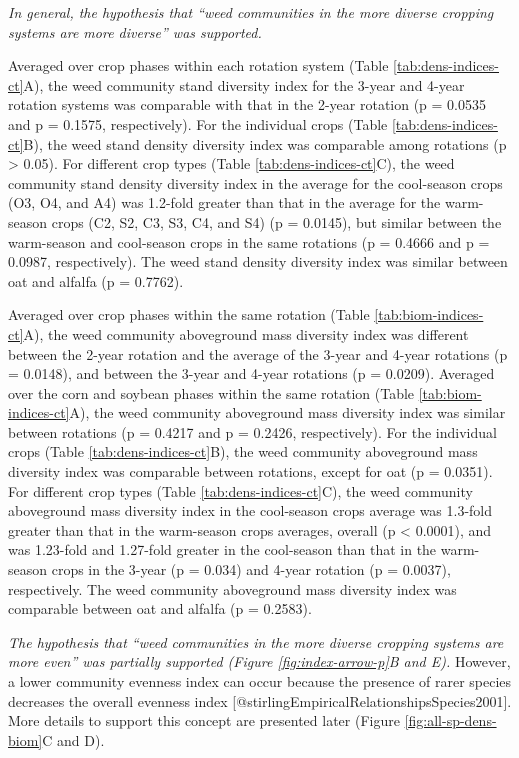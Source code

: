 \documentclass[
]{article}
\begin{document}
\emph{In general, the hypothesis that ``weed communities in the more diverse cropping systems are more diverse'' was supported.}

Averaged over crop phases within each rotation system (Table \ref{tab:dens-indices-ct}A), the weed community stand diversity index for the 3-year and 4-year rotation systems was comparable with that in the 2-year rotation (p = 0.0535 and p = 0.1575, respectively). For the individual crops (Table \ref{tab:dens-indices-ct}B), the weed stand density diversity index was comparable among rotations (p \textgreater{} 0.05). For different crop types (Table \ref{tab:dens-indices-ct}C), the weed community stand density diversity index in the average for the cool-season crops (O3, O4, and A4) was 1.2-fold greater than that in the average for the warm-season crops (C2, S2, C3, S3, C4, and S4) (p = 0.0145), but similar between the warm-season and cool-season crops in the same rotations (p = 0.4666 and p = 0.0987, respectively). The weed stand density diversity index was similar between oat and alfalfa (p = 0.7762).

Averaged over crop phases within the same rotation (Table \ref{tab:biom-indices-ct}A), the weed community aboveground mass diversity index was different between the 2-year rotation and the average of the 3-year and 4-year rotations (p = 0.0148), and between the 3-year and 4-year rotations (p = 0.0209). Averaged over the corn and soybean phases within the same rotation (Table \ref{tab:biom-indices-ct}A), the weed community aboveground mass diversity index was similar between rotations (p = 0.4217 and p = 0.2426, respectively). For the individual crops (Table \ref{tab:dens-indices-ct}B), the weed community aboveground mass diversity index was comparable between rotations, except for oat (p = 0.0351). For different crop types (Table \ref{tab:dens-indices-ct}C), the weed community aboveground mass diversity index in the cool-season crops average was 1.3-fold greater than that in the warm-season crops averages, overall (p \textless{} 0.0001), and was 1.23-fold and 1.27-fold greater in the cool-season than that in the warm-season crops in the 3-year (p = 0.034) and 4-year rotation (p = 0.0037), respectively. The weed community aboveground mass diversity index was comparable between oat and alfalfa (p = 0.2583).

\emph{The hypothesis that ``weed communities in the more diverse cropping systems are more even'' was partially supported (Figure \ref{fig:index-arrow-p}B and E).} However, a lower community evenness index can occur because the presence of rarer species decreases the overall evenness index {[}@stirlingEmpiricalRelationshipsSpecies2001{]}. More details to support this concept are presented later (Figure \ref{fig:all-sp-dens-biom}C and D).
\end{document}
